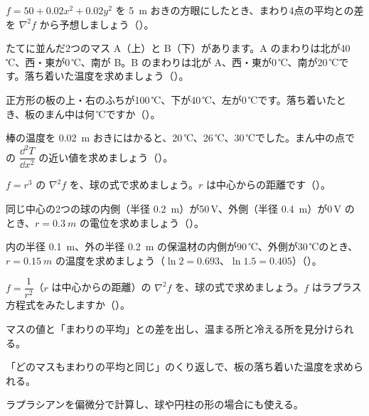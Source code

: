\bkproblem $f=50+0.02x^2+0.02y^2$ を \qty{5}{m} おきの方眼にしたとき、まわり4点の平均との差を $\nabla^2f$ から予想しましょう\mbox{（）}。

\bkproblem たてに並んだ2つのマス A（上）と B（下）があります。A のまわりは北が40\,℃、西・東が0\,℃、南が B。B のまわりは北が A、西・東が0\,℃、南が20\,℃です。落ち着いた温度を求めましょう\mbox{（）}。

\bkproblem 正方形の板の上・右のふちが100\,℃、下が40\,℃、左が0\,℃です。落ち着いたとき、板のまん中は何\,℃ですか\mbox{（）}。

\bkproblem 棒の温度を \qty{0.02}{m} おきにはかると、20\,℃、26\,℃、30\,℃でした。まん中の点での $\dfrac{\dd^2T}{\dd x^2}$ の近い値を求めましょう\mbox{（）}。

\bkproblem $f=r^3$ の $\nabla^2f$ を、球の式で求めましょう。$r$ は中心からの距離です\mbox{（）}。


\bkproblem 同じ中心の2つの球の内側（半径 \qty{0.2}{m}）が50\,V、外側（半径 \qty{0.4}{m}）が0\,V のとき、$r=\qty{0.3}{m}$ の電位を求めましょう\mbox{（）}。

\bkproblem 内の半径 \qty{0.1}{m}、外の半径 \qty{0.2}{m} の保温材の内側が90\,℃、外側が30\,℃のとき、$r=\qty{0.15}{m}$ の温度を求めましょう（$\ln2=0.693$、$\ln1.5=0.405$）\mbox{（）}。

\bkproblem $f=\dfrac{1}{r^2}$（$r$ は中心からの距離）の $\nabla^2f$ を、球の式で求めましょう。$f$ はラプラス方程式をみたしますか\mbox{（）}。

\begin{furikaeri}
\begin{checklist}
\item マスの値と「まわりの平均」との差を出し、温まる所と冷える所を見分けられる。
\item 「どのマスもまわりの平均と同じ」のくり返しで、板の落ち着いた温度を求められる。
\item ラプラシアンを偏微分で計算し、球や円柱の形の場合にも使える。
\end{checklist}
\end{furikaeri}

